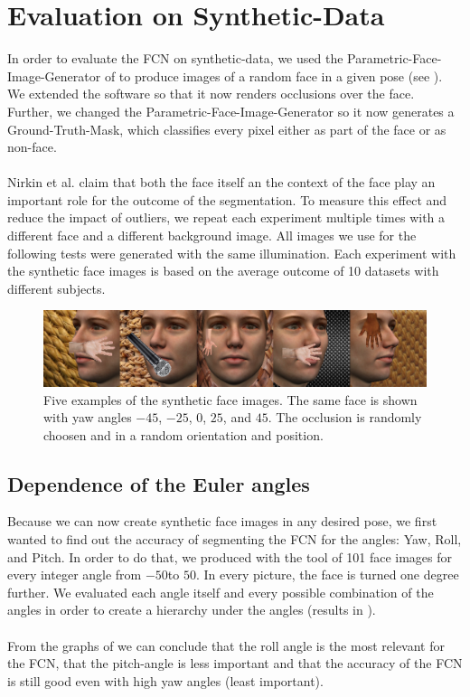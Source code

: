 \section{Evaluation on Synthetic-Data}
In order to evaluate the FCN on synthetic-data, we used the Parametric-Face-Image-Generator of \cite{parametric} to produce images of a random face in a given pose (see  ). We extended the software so that it now renders occlusions over the face. Further, we changed the Parametric-Face-Image-Generator so it now generates a Ground-Truth-Mask, which classifies every pixel either as part of the face or as non-face.\\
\\
Nirkin et al. \cite{nirkin2018_faceswap} claim that both the face itself an the context of the face play an important role for the outcome of the segmentation. To measure this effect and reduce the impact of outliers, we repeat each experiment multiple times with a different face and a different background image. All images we use for the following tests were generated with the same illumination. Each experiment with the synthetic face images is based on the average outcome of 10 datasets with different subjects.

\begin{figure}[h]
	\centering
	\includegraphics[width=\textwidth]{Figures/chap2/syntheticData_samples.png}
	\caption{Five examples of the synthetic face images. The same face is shown with yaw angles $-45$\textdegree, $-25$\textdegree, $0$\textdegree, $25$\textdegree, and $45$\textdegree. The occlusion is randomly choosen and in a random orientation and position.}
	\label{fig:syntheticData_samples}
\end{figure}

\subsection{Dependence of the Euler angles}
Because we can now create synthetic face images in any desired pose, we first wanted to find out the accuracy of segmenting the FCN for the angles: Yaw, Roll, and Pitch. In order to do that, we produced with the tool of \cite{parametric} 101 face images for every integer angle from $-50$\textdegree to $50$\textdegree. In every picture, the face is turned one degree further. We evaluated each angle itself and every possible combination of the angles in order to create a hierarchy under the angles (results in ).\\
\\
From the graphs of  we can conclude that the roll angle is the most relevant for the FCN, that the pitch-angle is less important and that the accuracy of the FCN is still good even with high yaw angles (least important). 

